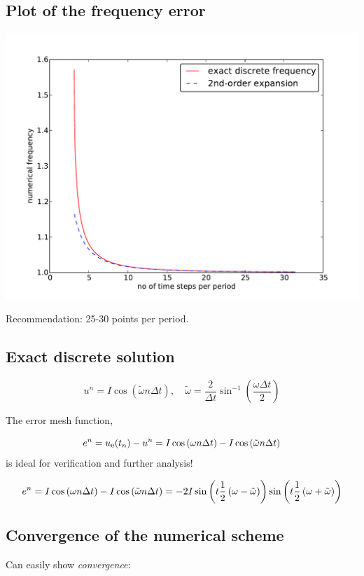 \documentclass[%
oneside,                 %
final,                   %
10pt]{article}
\begin{document}
\subsection*{Plot of the frequency error}



\centerline{\includegraphics[width=0.9\linewidth]{fig-vib/discrete_freq.pdf}}



Recommendation: 25-30 points per period.


\subsection*{Exact discrete solution}

\[
u^n = I\cos\left(\tilde\omega n\Delta t\right),\quad
\tilde\omega = \frac{2}{\Delta t}\sin^{-1}\left(\frac{\omega\Delta t}{2}\right)
\]

The error mesh function,

\[ e^n = \uex(t_n) - u^n =
I\cos\left(\omega n\Delta t\right)
- I\cos\left(\tilde\omega n\Delta t\right)
\]
is ideal for verification and further analysis!

\[
e^n = I\cos\left(\omega n\Delta t\right)
- I\cos\left(\tilde\omega n\Delta t\right)
= -2I\sin\left(t\half\left( \omega - \tilde\omega\right)\right)
\sin\left(t\half\left( \omega + \tilde\omega\right)\right)
\]

\subsection*{Convergence of the numerical scheme}

Can easily show \emph{convergence}:
\end{document}
